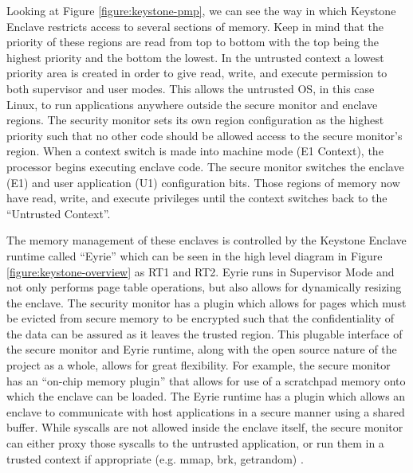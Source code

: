 Looking at Figure \ref{figure:keystone-pmp}, we can see the way in which Keystone Enclave restricts access to several sections of memory. Keep in mind that the priority of these regions are read from top to bottom with the top being the highest priority and the bottom the lowest. In the untrusted context a lowest priority area is created in order to give read, write, and execute permission to both supervisor and user modes. This allows the untrusted OS, in this case Linux, to run applications anywhere outside the secure monitor and enclave regions. The security monitor sets its own region configuration as the highest priority such that no other code should be allowed access to the secure monitor's region. When a context switch is made into machine mode (E1 Context), the processor begins executing enclave code. The secure monitor switches the enclave (E1) and user application (U1) configuration bits. Those regions of memory now have read, write, and execute privileges until the context switches back to the ``Untrusted Context''. 

The memory management of these enclaves is controlled by the Keystone Enclave runtime called ``Eyrie'' which can be seen in the high level diagram in Figure \ref{figure:keystone-overview} as RT1 and RT2. Eyrie runs in Supervisor Mode and not only performs page table operations, but also allows for dynamically resizing the enclave. The security monitor has a plugin which allows for pages which must be evicted from secure memory to be encrypted such that the confidentiality of the data can be assured as it leaves the trusted region. This plugable interface of the secure monitor and Eyrie runtime, along with the open source nature of the project as a whole, allows for great flexibility. For example, the secure monitor has an ``on-chip memory plugin'' \cite{lee2019keystone} that allows for use of a scratchpad memory onto which the enclave can be loaded. The Eyrie runtime has a plugin which allows an enclave to communicate with host applications in a secure manner using a shared buffer. While syscalls are not allowed inside the enclave itself, the secure monitor can either proxy those syscalls to the untrusted application, or run them in a trusted context if appropriate (e.g. mmap, brk, getrandom) \cite{lee2019keystone}.


